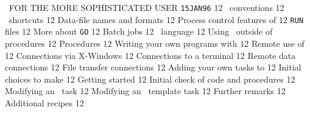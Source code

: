     {\AIPS\ FOR THE MORE SOPHISTICATED USER%
}                    {{\tt 15JAN96}\hskip 0.6cm 12}
   {\AIPS\ conventions}                         {12}
 {\AIPS\ shortcuts}                           {12}
 {Data-file names and formats}                {12}
   {Process control features of \AIPS}          {12}
 {{\tt RUN} files}                            {12}
 {More about {\tt GO}}                        {12}
 {Batch jobs}                                 {12}
   {\AIPS\ language}                            {12}
 {Using \POPS\ outside of procedures}         {12}
 {Procedures}                                 {12}
 {Writing your own programs with \POPS}       {12}
   {Remote use of \AIPS}                        {12}
 {Connections via X-Windows}                  {12}
 {Connections to a terminal}                  {12}
 {Remote data connections}                    {12}
 {File transfer connections}                  {12}
   {Adding your own tasks to \AIPS}             {12}
 {Initial choices to make}                    {12}
 {Getting started}                            {12}
 {Initial check of code and procedures}       {12}
 {Modifying an \AIPS\ task}                   {12}
 {Modifying an \AIPS\ template task}          {12}
 {Further remarks}                            {12}
   {Additional recipes}                         {12}

